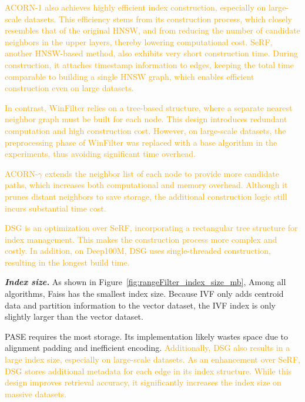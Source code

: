 \documentclass[sigconf, nonacm]{acmart}
\begin{document}
		\textcolor{orange}{
	ACORN-1 also achieves highly efficient index construction, especially on large-scale datasets. This efficiency stems from its construction process, which closely resembles that of the original HNSW, and from reducing the number of candidate neighbors in the upper layers, thereby lowering computational cost. SeRF, another HNSW-based method, also exhibits very short construction time. During construction, it attaches timestamp information to edges, keeping the total time comparable to building a single HNSW graph, which enables efficient construction even on large datasets.}
	
		\textcolor{orange}{
	In contrast, WinFilter relies on a tree-based structure, where a separate nearest neighbor graph must be built for each node. This design introduces redundant computation and high construction cost. However, on large-scale datasets, the preprocessing phase of WinFilter was replaced with a base algorithm in the experiments, thus avoiding significant time overhead.}
	
		\textcolor{orange}{
	ACORN-\(\gamma\)  extends the neighbor list of each node to provide more candidate paths, which increases both computational and memory overhead. Although it prunes distant neighbors to save storage, the additional construction logic still incurs substantial time cost.}
	
	
		\textcolor{orange}{
	DSG is an optimization over SeRF, incorporating a rectangular tree structure for index management. This makes the construction process more complex and costly. In addition, on Deep100M, DSG uses single-threaded construction, resulting in the longest build time.}
	
	\textit{\textbf{Index size.}} 
	As shown in Figure~\ref{fig:rangeFilter_index_size_mb}, Among all algorithms, Faiss has the smallest index size. Because IVF only adds centroid data and partition information to the vector dataset, the IVF index is only slightly larger than the vector dataset.

	
	PASE requires the most storage. Its implementation likely wastes space due to alignment padding and inefficient encoding. %
	\textcolor{orange}{Additionally, DSG also results in a large index size, especially on large-scale datasets. As an enhancement over SeRF, DSG stores additional metadata for each edge in its index structure. While this design improves retrieval accuracy, it significantly increases the index size on massive datasets.}
	
\end{document}
